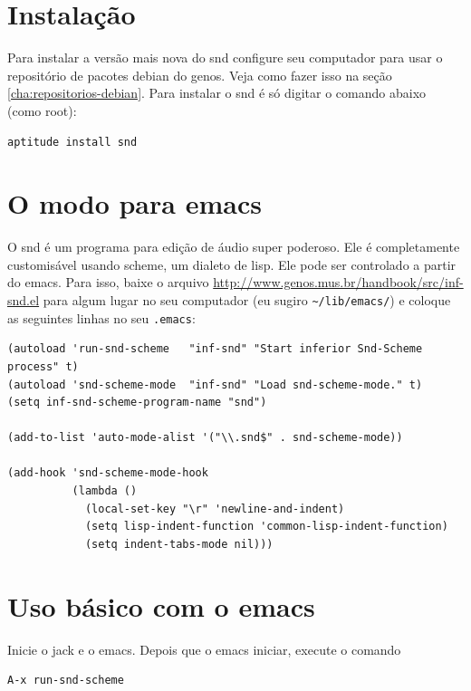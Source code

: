 \documentclass[12pt,brazil]{book}
\begin{document}
\section{Instalação}
\label{sec:instalacao-5}

Para instalar a versão mais nova do snd configure seu computador para
usar o repositório de pacotes debian do genos. Veja como fazer isso na
seção \ref{cha:repositorios-debian}. Para instalar o snd é só digitar
o comando abaixo (como root):

\begin{verbatim}
aptitude install snd
\end{verbatim}

\section{O modo para emacs}
\label{sec:o-modo-para-1}

O snd é um programa para edição de áudio super poderoso. Ele é
completamente customisável usando scheme, um dialeto de lisp. Ele pode
ser controlado a partir do emacs. Para isso, baixe o arquivo
\url{http://www.genos.mus.br/handbook/src/inf-snd.el} para algum lugar no seu
computador (eu sugiro \verb|~/lib/emacs/|) e coloque as seguintes
linhas no seu \texttt{.emacs}:

\begin{verbatim}
(autoload 'run-snd-scheme   "inf-snd" "Start inferior Snd-Scheme process" t)
(autoload 'snd-scheme-mode  "inf-snd" "Load snd-scheme-mode." t)
(setq inf-snd-scheme-program-name "snd")

(add-to-list 'auto-mode-alist '("\\.snd$" . snd-scheme-mode))

(add-hook 'snd-scheme-mode-hook
          (lambda ()
            (local-set-key "\r" 'newline-and-indent)
            (setq lisp-indent-function 'common-lisp-indent-function)
            (setq indent-tabs-mode nil)))
\end{verbatim}

\section{Uso básico com o emacs}
\label{sec:uso-basico-3}

Inicie o jack e o emacs. Depois que o emacs iniciar, execute o comando

\begin{verbatim}
A-x run-snd-scheme
\end{verbatim}
\end{document}
